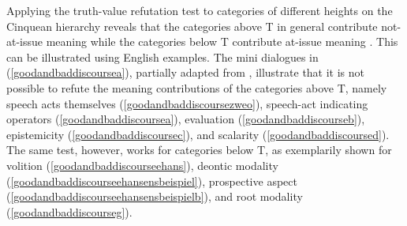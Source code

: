 Applying the truth-value refutation test to categories of different heights on the Cinquean hierarchy reveals that the categories above T in general contribute not-at-issue meaning while the categories below T contribute at-issue meaning \citep{bross2017scope}. This can be illustrated using English examples. The mini dialogues in (\ref{goodandbaddiscoursea}), partially adapted from \citep[10]{bross2017scope}, illustrate that it is not possible to refute the meaning contributions of the categories above T, namely speech acts themselves (\ref{goodandbaddiscoursezweo}), speech-act indicating operators (\ref{goodandbaddiscoursea}), evaluation (\ref{goodandbaddiscourseb}), epistemicity (\ref{goodandbaddiscoursec}), and scalarity (\ref{goodandbaddiscoursed}). The same test, however, works for categories below T, as exemplarily shown for volition (\ref{goodandbaddiscourseehans}), deontic modality (\ref{goodandbaddiscourseehansensbeispiel}), prospective aspect (\ref{goodandbaddiscourseehansensbeispielb}), and root modality (\ref{goodandbaddiscourseg}).

